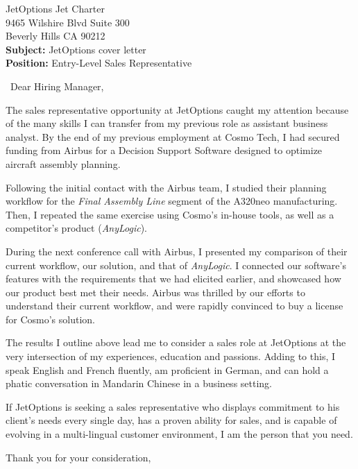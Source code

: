 \documentclass{letter}
\begin{document}
\signature{Marius Peter}
\longindentation=0pt
\address{Marius Peter\\
11090 Strathmore Dr\\
Los Angeles CA 90024
}


\begin{letter}{JetOptions Jet Charter\\
9465 Wilshire Blvd Suite 300\\
Beverly Hills CA 90212\\
\bigskip
\textbf{Subject:} JetOptions cover letter\\
\textbf{Position:} Entry-Level Sales Representative\\
}
\opening{\vfill~Dear Hiring Manager,}

The sales representative opportunity at JetOptions caught my attention because of the many skills I can transfer from my previous role as assistant business analyst.
By the end of my previous employment at Cosmo Tech, I had secured funding from Airbus for a Decision Support Software designed to optimize aircraft assembly planning.  

Following the initial contact with the Airbus team, I studied their planning workflow for the \emph{Final Assembly Line} segment of the A320neo manufacturing.
Then, I repeated the same exercise using Cosmo's in-house tools, as well as a competitor's product (\textit{AnyLogic}).

During the next conference call with Airbus, I presented my comparison of their current workflow, our solution, and that of \textit{AnyLogic}. 
I connected our software's features with the requirements that we had elicited earlier, and showcased how our product best met their needs.
Airbus was thrilled by our efforts to understand their current workflow, and were rapidly convinced to buy a license for Cosmo's solution.


The results I outline above lead me to consider a sales role at JetOptions at the very intersection of my experiences, education and passions.
Adding to this, I speak English and French fluently, am proficient in German, and can hold a phatic conversation in Mandarin Chinese in a business setting. 

If JetOptions is seeking a sales representative who displays commitment to his client's needs every single day, has a proven ability for sales, and is capable of evolving in a multi-lingual customer environment, I am the person that you need.

\closing{Thank you for your consideration,}


\end{letter}
\end{document}
